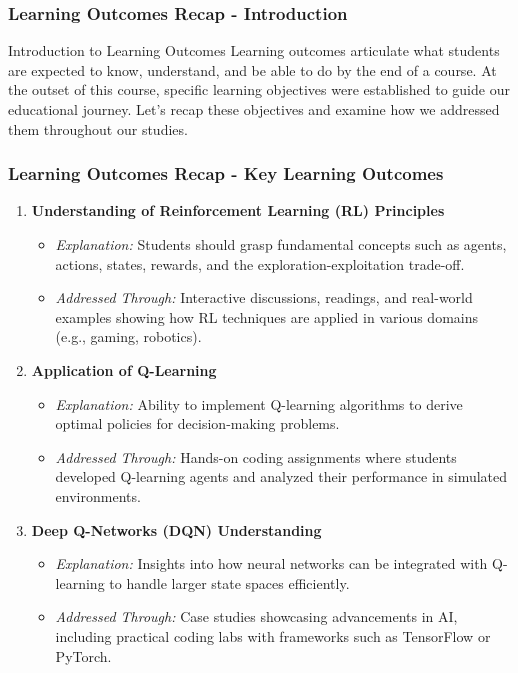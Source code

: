 \documentclass[aspectratio=169]{beamer}
\begin{document}
\begin{frame}[fragile]
    \frametitle{Learning Outcomes Recap - Introduction}
    \begin{block}{Introduction to Learning Outcomes}
        Learning outcomes articulate what students are expected to know, understand, and be able to do by the end of a course. At the outset of this course, specific learning objectives were established to guide our educational journey. Let’s recap these objectives and examine how we addressed them throughout our studies.
    \end{block}
\end{frame}

\begin{frame}[fragile]
    \frametitle{Learning Outcomes Recap - Key Learning Outcomes}
    \begin{enumerate}
        \item \textbf{Understanding of Reinforcement Learning (RL) Principles}
            \begin{itemize}
                \item \textit{Explanation:} Students should grasp fundamental concepts such as agents, actions, states, rewards, and the exploration-exploitation trade-off.
                \item \textit{Addressed Through:} Interactive discussions, readings, and real-world examples showing how RL techniques are applied in various domains (e.g., gaming, robotics).
            \end{itemize}
        
        \item \textbf{Application of Q-Learning}
            \begin{itemize}
                \item \textit{Explanation:} Ability to implement Q-learning algorithms to derive optimal policies for decision-making problems.
                \item \textit{Addressed Through:} Hands-on coding assignments where students developed Q-learning agents and analyzed their performance in simulated environments.
            \end{itemize}
        
        \item \textbf{Deep Q-Networks (DQN) Understanding}
            \begin{itemize}
                \item \textit{Explanation:} Insights into how neural networks can be integrated with Q-learning to handle larger state spaces efficiently.
                \item \textit{Addressed Through:} Case studies showcasing advancements in AI, including practical coding labs with frameworks such as TensorFlow or PyTorch.
            \end{itemize}
    \end{enumerate}
\end{frame}
\end{document}
